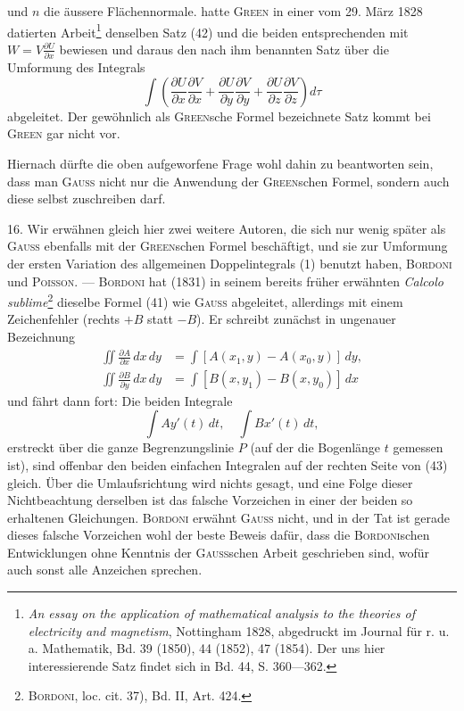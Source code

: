 und $n$ die äussere Flächennormale.  hatte \textsc{Green} in einer vom
29. März 1828 datierten Arbeit\footnote{\textit{An essay on the application of mathematical analysis to the theories of electricity and magnetism},
Nottingham 1828, abgedruckt im Journal für r. u. a. Mathematik, Bd. 39 (1850), 44 (1852), 47 (1854). Der uns
hier interessierende Satz findet sich in Bd. 44, S. 360—362.} denselben Satz (42) und die beiden entsprechenden
mit $W=V\frac{\partial U}{\partial x}$ bewiesen und daraus den nach ihm benannten
Satz über die Umformung des Integrals
\[
\int\left(\frac{\partial U}{\partial x}\frac{\partial V}{\partial x}
+\frac{\partial U}{\partial y}\frac{\partial V}{\partial y}
+\frac{\partial U}{\partial z}\frac{\partial V}{\partial z}\right)d\tau
\]
abgeleitet. Der gewöhnlich als \textsc{Green}sche Formel bezeichnete Satz  kommt bei \textsc{Green} gar nicht vor.

Hiernach dürfte die oben aufgeworfene Frage wohl dahin zu beantworten
sein, dass man \textsc{Gauss} nicht nur die Anwendung der \textsc{Green}schen Formel,
sondern auch diese selbst zuschreiben darf.

16. Wir erwähnen gleich hier zwei weitere Autoren, die sich nur wenig
später als \textsc{Gauss} ebenfalls mit der \textsc{Green}schen Formel beschäftigt, und sie
zur Umformung der ersten Variation des allgemeinen Doppelintegrals (1)
benutzt haben, \textsc{Bordoni} und \textsc{Poisson}. — \textsc{Bordoni} hat (1831) in seinem bereits
früher erwähnten \textit{Calcolo sublime}\footnote{\textsc{Bordoni}, loc. cit. 37), Bd. II, Art. 424.} dieselbe Formel (41) wie \textsc{Gauss} abgeleitet,
\clearpage{}
\noindent allerdings mit einem Zeichenfehler (rechts $+B$ statt $-B$). Er schreibt
zunächst in ungenauer Bezeichnung
\begin{equation*}
\begin{aligned}
\iint\frac{\partial A}{\partial x}\,dx\,dy&=\int[A(x_1,y)-A(x_0,y)]\,dy,\\
\iint\frac{\partial B}{\partial y}\,dx\,dy&=\int[B(x,y_1)-B(x,y_0)]\,dx
\end{aligned}\tag{43}
\end{equation*}
und fährt dann fort: Die beiden Integrale
\[
\int Ay'(t)\,dt,\quad\int Bx'(t)\,dt,
\]
erstreckt über die ganze Begrenzungslinie $P$ (auf der die Bogenlänge $t$ gemessen
ist), sind offenbar den beiden einfachen Integralen auf der rechten
Seite von (43) gleich. Über die Umlaufsrichtung wird nichts gesagt, und eine
Folge dieser Nichtbeachtung derselben ist das falsche Vorzeichen in einer der
beiden so erhaltenen Gleichungen. \textsc{Bordoni} erwähnt \textsc{Gauss} nicht, und in der
Tat ist gerade dieses falsche Vorzeichen wohl der beste Beweis dafür, dass
die \textsc{Bordoni}schen Entwicklungen ohne Kenntnis der \textsc{Gauss}schen Arbeit geschrieben
sind, wofür auch sonst alle Anzeichen sprechen.

